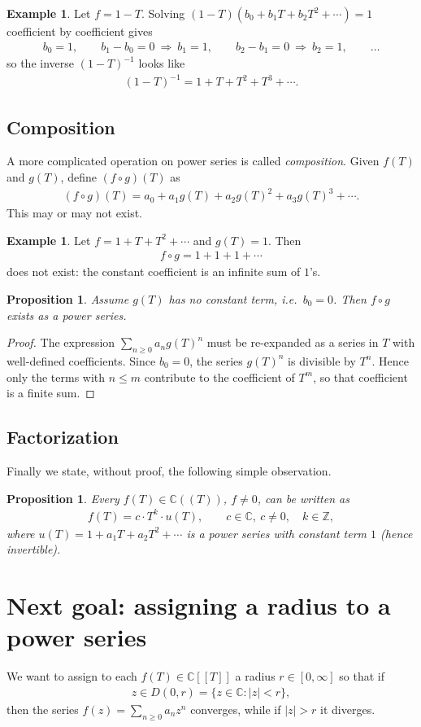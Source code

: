 \documentclass[11pt]{article}
\theoremstyle{plain}
\newtheorem{proposition}[theorem]{Proposition}
\theoremstyle{definition}
\newtheorem{example}[theorem]{Example}
\theoremstyle{remark}
\numberwithin{equation}{section}
\newcommand{\be}{\begin{eqnarray}}
\newcommand{\ee}{\end{eqnarray}}
\newcommand{\C}{\mathbb{C}}
\newcommand{\CT}{\C[[T]]}
\newcommand{\CLT}{\C((T))}
\begin{document}
\begin{example}
Let $f=1-T$. Solving $(1-T)(b_0+b_1T+b_2T^2+\cdots)=1$ coefficient by
coefficient gives
\be
 b_0=1,\qquad b_1-b_0=0\ \Longrightarrow\ b_1=1,
 \qquad b_2-b_1=0\ \Longrightarrow\ b_2=1,\qquad\dots
\ee
so the inverse $(1-T)^{-1}$ looks like
\be
 (1-T)^{-1}=1+T+T^2+T^3+\cdots.
\ee
\end{example}

\subsection{Composition}
A more complicated operation on power series is called \emph{composition}.
Given $f(T)$ and $g(T)$, define $(f\circ g)(T)$ as
\be
 (f\circ g)(T)=a_0+a_1g(T)+a_2g(T)^2+a_3g(T)^3+\cdots.
\ee
This may or may not exist.

\begin{example}
Let $f=1+T+T^2+\cdots$ and $g(T)=1$. Then
\be
 f\circ g=1+1+1+\cdots
\ee
does not exist: the constant coefficient is an infinite sum of $1$'s.
\end{example}

\begin{proposition}
Assume $g(T)$ has no constant term, i.e.\ $b_0=0$. Then $f\circ g$ exists as
a power series.
\end{proposition}

\begin{proof}
The expression $\sum_{n\ge0}a_ng(T)^n$ must be re-expanded as a series in
$T$ with well-defined coefficients. Since $b_0=0$, the series $g(T)^n$ is
divisible by $T^n$. Hence only the terms with $n\le m$ contribute to the
coefficient of $T^m$, so that coefficient is a finite sum.
\end{proof}

\subsection{Factorization}
Finally we state, without proof, the following simple observation.

\begin{proposition}
Every $f(T)\in\CLT$, $f \neq 0$, can be written as
\be
 f(T)=c\cdot T^k\cdot u(T),
 \qquad c\in\C,\ c\ne0,\quad k\in\mathbb{Z},
\ee
where $u(T)=1+a_1T+a_2T^2+\cdots$ is a power series with constant term $1$
(hence invertible).
\end{proposition}

\section*{Next goal: assigning a radius to a power series}
We want to assign to each $f(T)\in\CT$ a radius $r\in[0,\infty]$ so that if
\be
 z\in D(0,r)=\{z\in\C:|z|<r\},
\ee
then the series $f(z)=\sum_{n\ge0}a_nz^n$ converges, while if $|z|>r$ it
diverges.
\end{document}
